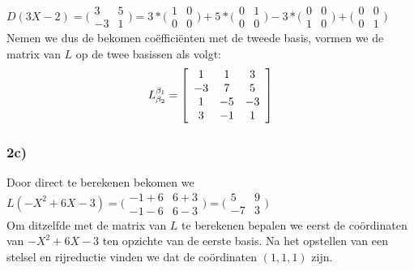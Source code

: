 \documentclass[lineaire_algebra_oplossingen.tex]{subfiles}
\begin{document}
$D(3X-2) = \bigl(
\begin{smallmatrix}
3&5\\ -3&1
\end{smallmatrix}
\bigr) = 3* \bigl(
\begin{smallmatrix}
1&0\\ 0&0
\end{smallmatrix}
\bigr) + 5* \bigl(
\begin{smallmatrix}
0&1\\ 0&0
\end{smallmatrix}
\bigr) - 3* \bigl(
\begin{smallmatrix}
0&0\\ 1&0
\end{smallmatrix}
\bigr) + \bigl(
\begin{smallmatrix}
0&0\\ 0&1
\end{smallmatrix}
\bigr)$\\

Nemen we dus de bekomen co\"effici\"enten met de tweede basis, vormen we de matrix van $L$ op de twee basissen als volgt:\\

\[
L^{\beta_1}_{\beta_2} =
\left[
\begin{array}{c c c}
1 & 1 & 3\\
-3 & 7 & 5\\
1 & -5 & -3\\
3 & -1 & 1
\end{array}
\right]
\]

\subsubsection*{2c)}

Door direct te berekenen bekomen we\\

$ L(-X^2+6X-3) = \bigl(
\begin{smallmatrix}
-1+6&6+3\\ -1-6&6-3
\end{smallmatrix}\bigr) = \bigl(
\begin{smallmatrix}
5&9\\ -7&3
\end{smallmatrix}\bigr)$\\

Om ditzelfde met de matrix van $L$ te berekenen bepalen we eerst de co\"ordinaten van $-X^2+6X-3$ ten opzichte van de eerste basis.
Na het opstellen van een stelsel en rijreductie vinden we dat de co\"ordinaten $(1,1,1)$ zijn.
\end{document}
